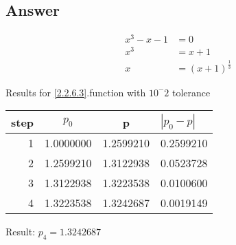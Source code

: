 \documentclass{article}
\begin{document}
\subsection{Answer}
\begin{align}
\label{2.2.6.1}
x^3 -x-1 & = 0\\
\label{2.2.6.2}
x^3 & = x+1\\
\label{2.2.6.3}
x & = (x+1)^ \frac{1}{3}
\end{align}

Results for \ref{2.2.6.3}.function with $10^-2$ tolerance\\
\begin{tabular}{r|cc|l}
step & $p_0$ & p & $|p_0-p|$\\
\hline
1 & 1.0000000 & 1.2599210 & 0.2599210\\
2 & 1.2599210 & 1.3122938 & 0.0523728\\
3 & 1.3122938 & 1.3223538 & 0.0100600\\
4 & 1.3223538 & 1.3242687 & 0.0019149\\
\end{tabular}

Result: $p_4= 1.3242687$
\end{document}
